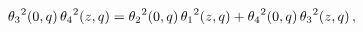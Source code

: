 \[{\mathop{\theta_{3}\/}\nolimits^{2}}\!\left(0,q\right){\mathop{\theta_{4}\/}%
\nolimits^{2}}\!\left(z,q\right)={\mathop{\theta_{2}\/}\nolimits^{2}}\!\left(0%
,q\right){\mathop{\theta_{1}\/}\nolimits^{2}}\!\left(z,q\right)+{\mathop{%
\theta_{4}\/}\nolimits^{2}}\!\left(0,q\right){\mathop{\theta_{3}\/}\nolimits^{%
2}}\!\left(z,q\right),\]